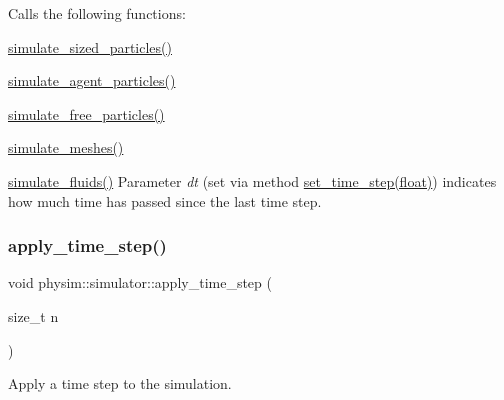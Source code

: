 Calls the following functions\+:
\begin{DoxyItemize}
\item \hyperlink{classphysim_1_1simulator_ac99a02f99b4f83501478093d402abea5}{simulate\+\_\+sized\+\_\+particles()}
\item \hyperlink{classphysim_1_1simulator_a99dbf5870ec5383266f87e60c1686049}{simulate\+\_\+agent\+\_\+particles()}
\item \hyperlink{classphysim_1_1simulator_ac836fc5c8ccf186b8030da54586a8b07}{simulate\+\_\+free\+\_\+particles()}
\item \hyperlink{classphysim_1_1simulator_aea4165314f9285dfc3b64ba9a2666aaf}{simulate\+\_\+meshes()}
\item \hyperlink{classphysim_1_1simulator_a63f7f4b59a79b8b294aaa6d8870fccd2}{simulate\+\_\+fluids()} Parameter {\itshape dt} (set via method \hyperlink{classphysim_1_1simulator_ab86bf6d22fd222a299183c9d82a71bc1}{set\+\_\+time\+\_\+step(float)}) indicates how much time has passed since the last time step. 
\end{DoxyItemize}\mbox{\label{classphysim_1_1simulator_a5bee70bb8d7f0744e47f1ae76b3c8189}} 
\subsubsection{\texorpdfstring{apply\+\_\+time\+\_\+step()}{apply\_time\_step()}\hspace{0.1cm}{\footnotesize\ttfamily [2/2]}}
{\footnotesize\ttfamily void physim\+::simulator\+::apply\+\_\+time\+\_\+step (\begin{DoxyParamCaption}\item[{size\+\_\+t}]{n }\end{DoxyParamCaption})}



Apply a time step to the simulation. 

